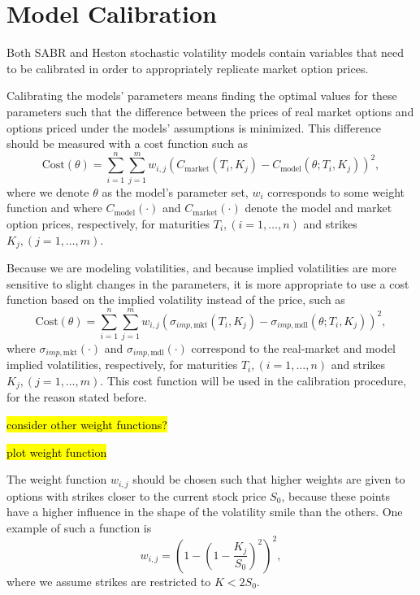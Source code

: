  
 
\section{Model Calibration}
\label{section:Model Calibration}
Both SABR and Heston stochastic volatility models contain variables that need to be calibrated in order to appropriately replicate market option prices.


Calibrating the models' parameters means finding the optimal values for these parameters such that the difference between the prices of real market options and options priced under the models' assumptions is minimized. This difference should be measured with a cost function such as
\begin{equation}
\mathrm{Cost}(\theta)=\sum_{i=1}^n\sum_{j=1}^mw_{i,j}\left(C_{\mathrm{market}}(T_i,K_j)-C_{\mathrm{model}}(\theta;T_i,K_j)\right)^2,
\end{equation}
\noindent where we denote $\theta$ as the model's parameter set, $w_i$ corresponds to some weight function and where $C_{\mathrm{model}}(\cdot)$ and $C_{\mathrm{market}}(\cdot)$ denote the model and market option prices, respectively, for maturities $T_i,(i=1,\ldots,n)$ and strikes $K_j,(j=1,\ldots,m)$.

Because we are modeling volatilities, and because implied volatilities are more sensitive to slight changes in the parameters, it is more appropriate to use a cost function based on the implied volatility instead of the price, such as
\begin{equation}\label{cost}
\mathrm{Cost}(\theta)=\sum_{i=1}^n\sum_{j=1}^mw_{i,j}\left(\sigma_{imp,\mathrm{mkt}}(T_i,K_j)-\sigma_{imp,\mathrm{mdl}}(\theta;T_i,K_j)\right)^2,
\end{equation}
\noindent where $\sigma_{imp,\mathrm{mkt}}(\cdot)$ and $\sigma_{imp,\mathrm{mdl}}(\cdot)$ correspond to the real-market and model implied volatilities, respectively, for maturities $T_i,(i=1,\ldots,n)$ and strikes $K_j,(j=1,\ldots,m)$. This cost function will be used in the calibration procedure, for the reason stated before.

\hl{consider other weight functions?}

\hl{plot weight function}

The weight function $w_{i,j}$ should be chosen such that higher weights are given to options with strikes closer to the current stock price $S_0$, because these points have a higher influence in the shape of the volatility smile than the others.
One example of such a function is
\begin{equation}
w_{i,j}=\left(1-\left(1-\frac{K_j}{S_0}\right)^2\right)^2,
\end{equation}
\noindent where we assume strikes are restricted to $K<2S_0$.


